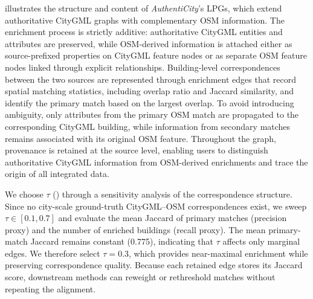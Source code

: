\documentclass[sigconf,authordraft]{acmart}
\newcommand{\benchname}{\textit{Authenti\-City}}
\begin{document}
 illustrates the structure and content of \benchname{}'s LPGs, which extend authoritative CityGML graphs with complementary OSM information. The enrichment process is strictly additive: authoritative CityGML entities and attributes are preserved, while OSM-derived information is attached either as source-prefixed properties on CityGML feature nodes or as separate OSM feature nodes linked through explicit relationships. Building-level correspondences between the two sources are represented through enrichment edges that record spatial matching statistics, including overlap ratio and Jaccard similarity, and identify the primary match based on the largest overlap. To avoid introducing ambiguity, only attributes from the primary OSM match are propagated to the corresponding CityGML building, while information from secondary matches remains associated with its original OSM feature. 
Throughout the graph, provenance is retained at the source level, enabling users to distinguish authoritative CityGML information from OSM-derived enrichments and trace the origin of all integrated data. 

We choose \(\tau\) () through a sensitivity analysis of the correspondence structure. Since no city-scale ground-truth CityGML--OSM correspondences exist, we sweep \(\tau \in [0.1, 0.7]\) and evaluate the mean Jaccard of primary matches (precision proxy) and the number of enriched buildings (recall proxy). The mean primary-match Jaccard remains constant (0.775), indicating that \(\tau\) affects only marginal edges. 
We therefore select \(\tau = 0.3\), which provides near-maximal enrichment while preserving correspondence quality. Because each retained edge stores its Jaccard score, downstream methods can reweight or rethreshold matches without repeating the alignment. 
\end{document}

